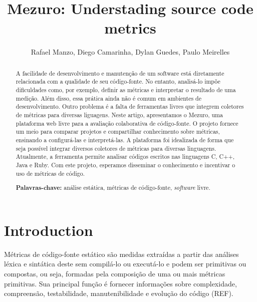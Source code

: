 \documentclass{llncs}
\begin{document}
\sloppy
\title{Mezuro: Understading source code metrics}

\author{Rafael Manzo, Diego Camarinha,
        Dylan Guedes, Paulo Meirelles}


\maketitle
\begin{abstract}
  A facilidade de desenvolvimento e manutenção de um software está
diretamente relacionada com a qualidade de seu código-fonte.
  No entanto, analisá-lo impõe dificuldades como, por exemplo, definir as
métricas e interpretar o resultado de uma medição. Além disso, essa prática
ainda não é comum em ambientes de desenvolvimento. Outro problema é a falta de
ferramentas livres que integrem coletores de métricas para diversas liguagens.
  Neste artigo, apresentamos o Mezuro, uma plataforma web livre para a
avaliação colaborativa de código-fonte. O projeto fornece um meio para comparar
projetos e compartilhar conhecimento sobre métricas, ensinando a configurá-las
e interpretá-las. A plataforma foi idealizada de forma que seja possível
integrar diversos coletores de métricas para diversas linguagens. Atualmente, a
ferramenta permite analisar códigos escritos nas linguagens C, C++, Java e
Ruby.
  Com este projeto, esperamos disseminar o conhecimento e incentivar o uso de
métricas de código.

\textbf{Palavras-chave:} análise estática, métricas de código-fonte,
\textit{software} livre.
\end{abstract}


\section{Introduction}
\label{sec:intro}

Métricas de código-fonte estático são medidas extraídas a partir das análises
léxica e sintática deste sem compilá-lo ou executá-lo e podem ser primitivas ou
compostas, ou seja, formadas pela composição de uma ou mais métricas
primitivas. Sua principal função é fornecer informações sobre complexidade,
compreensão, testabilidade, manutenibilidade e evolução do
código (REF).
\end{document}
